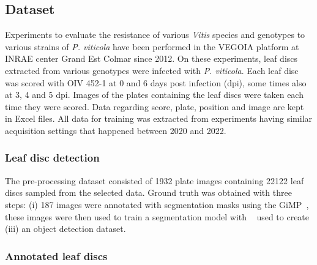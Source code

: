 \documentclass[english]{article}
\begin{document}
\subsection{Dataset}
Experiments to evaluate the resistance of various \textit{Vitis} species and genotypes to various strains of \textit{P. viticola} have been performed in the VEGOIA platform at INRAE center Grand Est Colmar since 2012. On these experiments, leaf discs extracted from various genotypes were infected with \textit{P. viticola}. Each leaf disc was scored with OIV 452-1 at 0 and 6 days post infection (dpi), some times also at 3, 4 and 5 dpi. Images of the plates containing the leaf discs were taken each time they were scored. Data regarding score, plate, position and image are kept in Excel files.
All data for training was extracted from experiments having similar acquisition settings that happened between 2020 and 2022.

\subsubsection{Leaf disc detection}
The pre-processing dataset consisted of 1932 plate images containing 22122 leaf discs sampled from the selected data. Ground truth was obtained with three steps: (i) 187 images were annotated with segmentation masks using the GiMP~\parencite{gimp}, these images were then used to train a segmentation model with ~\parencite{bergIlastikInteractiveMachine2019} used to create (iii) an object detection dataset.

\subsubsection{Annotated leaf discs}
\end{document}
